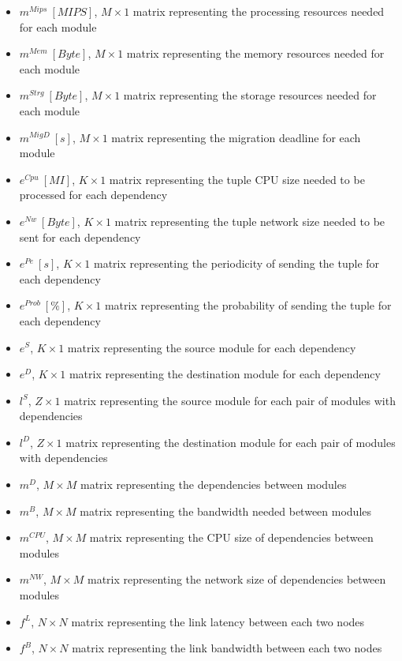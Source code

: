 \documentclass{article}
\begin{document}
\begin{itemize}
	\item $m^{Mips}~[MIPS]$, $M\times 1$ matrix representing the processing resources needed for each module
	\item $m^{Mem}~[Byte]$, $M\times 1$ matrix representing the memory resources needed for each module
	\item $m^{Strg}~[Byte]$, $M\times 1$ matrix representing the storage resources needed for each module
	\item $m^{MigD}~[s]$, $M\times 1$ matrix representing the migration deadline for each module\\
	
	\item $e^{Cpu}~[MI]$, $K\times 1$ matrix representing the tuple CPU size needed to be processed for each dependency
	\item $e^{Nw}~[Byte]$, $K\times 1$ matrix representing the tuple network size needed to be sent for each dependency
	\item $e^{Pe}~[s]$, $K\times 1$ matrix representing the periodicity of sending the tuple for each dependency
	\item $e^{Prob}~[\%]$, $K\times 1$ matrix representing the probability of sending the tuple for each dependency
	\item $e^{S}$, $K\times 1$ matrix representing the source module for each dependency
	\item $e^{D}$, $K\times 1$ matrix representing the destination module for each dependency\\
	
	\item $l^S$, $Z\times 1$ matrix representing the source module for each pair of modules with dependencies
	\item $l^D$, $Z\times 1$ matrix representing the destination module for each pair of modules with dependencies\\
	
	\item $m^D$, $M\times M$ matrix representing the dependencies between modules
	\item $m^B$, $M\times M$ matrix representing the bandwidth needed between modules
	\item $m^{CPU}$, $M\times M$ matrix representing the CPU size of dependencies between modules
	\item $m^{NW}$, $M\times M$ matrix representing the network size of dependencies between modules\\
	
	\item $f^L$, $N\times N$ matrix representing the link latency between each two nodes
	\item $f^B$, $N\times N$ matrix representing the link bandwidth between each two nodes\\
	

\end{itemize}
\end{document}
